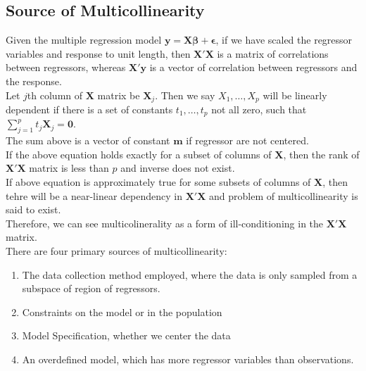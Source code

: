 \documentclass[11pt]{article}
\theoremstyle{definition}
\begin{document}
\subsection{Source of Multicollinearity}
Given the multiple regression model $\bm{y}=\bm{X\beta}+\bm{\epsilon}$, if we have scaled the regressor variables and response to unit length, then $\bm{X}'\bm{X}$ is a matrix of correlations between regressors, whereas $\bm{X}'\bm{y}$ is a vector of correlation between regressors and the response.\\
Let $j$th column of $\bm{X}$ matrix be $\bm{X}_j$. Then we say $X_1,\ldots, X_p$ will be linearly dependent if there is a set of constants $t_1,\ldots, t_p$ not all zero, such that $\sum_{j=1}^p t_j\bm{X}_j=\bm{0}$.\\
The sum above is a vector of constant $\bm{m}$ if regressor are not centered.\\
If the above equation holds exactly for a subset of columns of $\bm{X}$, then the rank of $\bm{X}'\bm{X}$ matrix is less than $p$ and inverse does not exist. \\
If above equation is approximately true for some subsets of columns of $\bm{X}$, then tehre will be a near-linear dependency in $\bm{X}'\bm{X}$ and problem of multicollinearity is said to exist.\\
Therefore, we can see multicolinerality as a form of ill-conditioning in the $\bm{X}'\bm{X}$ matrix. \\
There are four primary sources of multicollinearity:
\begin{enumerate}
  \item The data collection method employed, where the data is only sampled from a subspace of region of regressors.
  \item Constraints on the model or in the population
  \item Model Specification, whether we center the data
  \item An overdefined model, which has more regressor variables than observations.
\end{enumerate}
\end{document}
